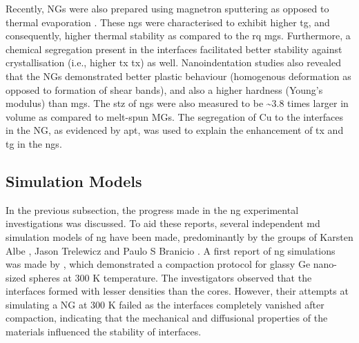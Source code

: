 Recently, \cz NGs were also prepared using magnetron sputtering as opposed to thermal evaporation \cite{Nandam2017,Nandam2018}. These \glspl{ng} were characterised to exhibit higher \gls{tg}, and consequently, higher thermal stability as compared to the \gls{rq} \gls{mg}s. Furthermore, a chemical segregation present in the interfaces facilitated better stability against crystallisation (i.e., higher \glsdesc{tx} \gls{tx}) as well. Nanoindentation studies also revealed that the NGs demonstrated better plastic behaviour (homogenous deformation as opposed to formation of shear bands), and also a higher hardness (Young's modulus) than \gls{mg}s. The \gls{stz} of \glspl{ng} were also measured to be \sim3.8 times larger in volume as compared to melt-spun MGs. The segregation of Cu to the interfaces in the NG, as evidenced by \gls{apt}, was used to explain the enhancement of \gls{tx} and \gls{tg} in the \gls{ng}s. \par

\subsection{Simulation Models}
In the previous subsection, the progress made in the \gls{ng} experimental investigations was discussed. To aid these reports, several independent \gls{md} simulation models of \gls{ng} have been made, predominantly by the groups of Karsten Albe \cite{Krasnochtchekov2003, Sopu2009, Ritter2011, Adjaoud2016, Adjaoud2018, Adjaoud2019, Adjaoud2020, Kalcher2017}, Jason Trelewicz \cite{Cheng2019,Cheng2019a} and Paulo S Branicio \cite{Adibi2014,Sha2017,Zheng2020,Zheng2021}. A first report of \gls{ng} simulations was made by \textcite{Sopu2009}, which demonstrated a compaction protocol for glassy Ge nano-sized spheres at 300 K temperature. The investigators observed that the interfaces formed with lesser densities than the cores. However, their attempts at simulating a \cz NG at 300 K failed as the interfaces completely vanished after compaction, indicating that the mechanical and diffusional properties of the materials influenced the stability of interfaces. \par

